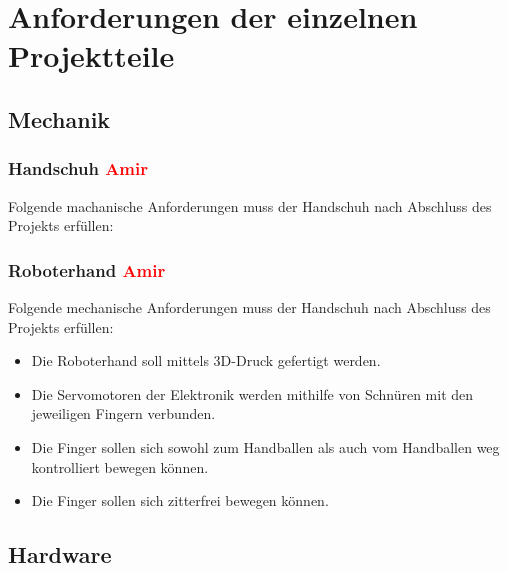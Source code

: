 \documentclass[11pt]{article}
\begin{document}
\hfill \break
\hfill \break
\hfill \break
\hfill \break
\hfill \break
\hfill \break
\hfill \break
\hfill \break


\section{Anforderungen der einzelnen Projektteile}

\subsection{Mechanik}
\subsubsection{Handschuh \textcolor{red}{Amir}}
Folgende machanische Anforderungen muss der Handschuh nach Abschluss des Projekts erfüllen:

\subsubsection{Roboterhand \textcolor{red}{Amir}}
Folgende mechanische Anforderungen muss der Handschuh nach Abschluss des Projekts erfüllen:

	\begin{itemize}
		\item Die Roboterhand soll mittels 3D-Druck gefertigt werden.
		\item Die Servomotoren der Elektronik werden mithilfe von Schnüren mit den jeweiligen Fingern verbunden.
		\item Die Finger sollen sich sowohl zum Handballen als auch vom Handballen weg kontrolliert bewegen können.
		\item Die Finger sollen sich zitterfrei bewegen können.
	\end{itemize}

\subsection{Hardware}
\end{document}
